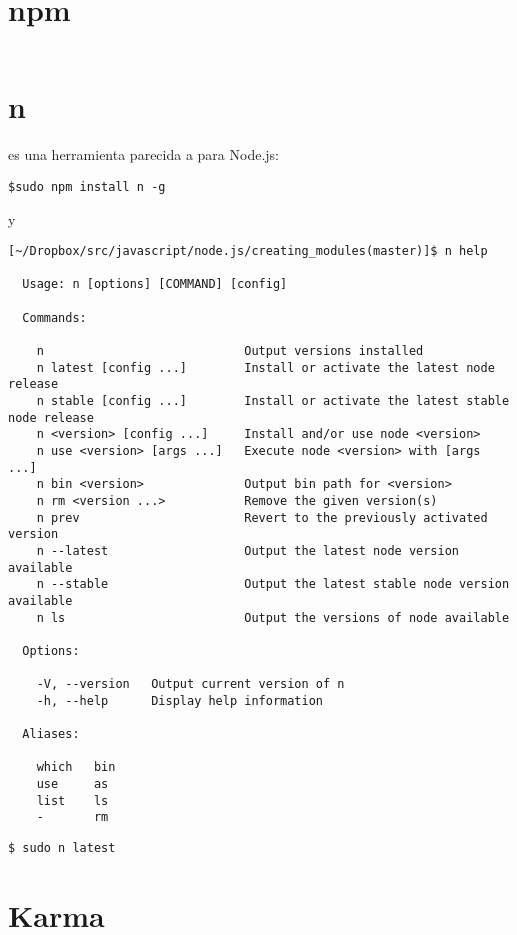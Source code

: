 \section{npm}

\begin{verbatim}
\end{verbatim}

\section{n}

 es una herramienta parecida a  para Node.js:
\begin{verbatim}
$sudo npm install n -g
\end{verbatim}
y

\begin{verbatim}
[~/Dropbox/src/javascript/node.js/creating_modules(master)]$ n help

  Usage: n [options] [COMMAND] [config]

  Commands:

    n                            Output versions installed
    n latest [config ...]        Install or activate the latest node release
    n stable [config ...]        Install or activate the latest stable node release
    n <version> [config ...]     Install and/or use node <version>
    n use <version> [args ...]   Execute node <version> with [args ...]
    n bin <version>              Output bin path for <version>
    n rm <version ...>           Remove the given version(s)
    n prev                       Revert to the previously activated version
    n --latest                   Output the latest node version available
    n --stable                   Output the latest stable node version available
    n ls                         Output the versions of node available

  Options:

    -V, --version   Output current version of n
    -h, --help      Display help information

  Aliases:

    which   bin
    use     as
    list    ls
    -       rm
\end{verbatim}

\begin{verbatim}
$ sudo n latest
\end{verbatim}

\section{Karma}
\label{subsection:karma}


